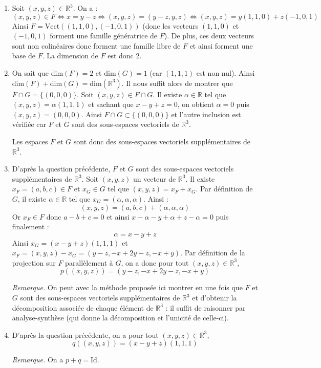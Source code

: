 \documentclass[a4paper,twoside,french,11pt]{VcCours}
\begin{document}
\begin{enumerate}
\item Soit $(x,y,z) \in \mathbb{R}^3$. On a :
$$ (x,y,z) \in F \Longleftrightarrow x=y-z \Longleftrightarrow (x,y,z) = (y-z,y,z) \Longleftrightarrow (x,y,z) = y(1,1,0) + z(-1,0,1)$$
Ainsi $F = \textrm{Vect}((1,1,0), (-1,0,1))$ (donc les vecteurs $(1,1,0)$ et $(-1,0,1)$ forment une famille génératrice de $F$). De plus, ces deux vecteurs sont non colinéaires donc forment une famille libre de $F$ et ainsi forment une base de $F$. La dimension de $F$ est donc $2$.
\item On sait que $\textrm{dim}(F)=2$ et $\textrm{dim}(G)=1$ (car $(1,1,1)$ est non nul). Ainsi $\textrm{dim}(F) + \textrm{dim}(G) = \textrm{dim}(\mathbb{R}^3)$. Il nous suffit alors de montrer que $F \cap G = \lbrace (0,0,0) \rbrace$. Soit $(x,y,z) \in F \cap G$. Il existe $\alpha \in \mathbb{R}$ tel que $(x,y,z) = \alpha (1,1,1)$ et sachant que $x-y+z=0$, on obtient $\alpha = 0$ puis $(x,y,z)=(0,0,0)$. Ainsi $F \cap G \subset \lbrace (0,0,0) \rbrace$ et l'autre inclusion est vérifiée car $F$ et $G$ sont des sous-espaces vectoriels de $\mathbb{R}^3$.



\noindent Les espaces $F$ et $G$ sont donc des sous-espaces vectoriels supplémentaires de $\mathbb{R}^3$.
\item D'après la question précédente, $F$ et $G$ sont  des sous-espaces vectoriels supplémentaires de $\mathbb{R}^3$. Soit $(x,y,z)$ un vecteur de $\mathbb{R}^3$. Il existe $x_F = (a,b,c) \in F$ et $x_G \in G$ tel que $(x,y,z) = x_F + x_G$. Par définition de $G$, il existe $\alpha \in \mathbb{R}$ tel que $x_G = (\alpha, \alpha, \alpha)$. Ainsi :
$$ (x,y,z) = (a,b,c) + (\alpha, \alpha, \alpha)$$
Or $x_F \in F$ donc $a-b+c=0$ et ainsi $x- \alpha- y + \alpha + z - \alpha = 0$ puis finalement :
$$ \alpha = x-y+z $$
Ainsi $x_G = (x-y+z) (1,1,1)$ et $x_F = (x,y,z) - x_G = (y-z, -x+2y-z,-x+y)$. Par définition de la projection sur $F$ parallèlement à $G$, on a donc pour tout $(x,y,z) \in \mathbb{R}^3$,
$$ p((x,y,z)) = (y-z, -x+2y-z,-x+y)$$



\noindent \textit{Remarque.} On peut avec la méthode proposée ici montrer en une fois que $F$ et $G$ sont des sous-espaces vectoriels supplémentaires de $\mathbb{R}^3$ et d'obtenir la décomposition associée de chaque élément de $\mathbb{R}^3$ : il suffit de raisonner par analyse-synthèse (qui donne la décomposition et l'unicité de celle-ci).
\item D'après la question précédente, on a pour tout $(x,y,z) \in \mathbb{R}^3$, 
$$ q((x,y,z)) = (x-y+z) (1,1,1)$$



\noindent \textit{Remarque.} On a $p+q=\textrm{Id}$.
\end{enumerate}
\end{document}
